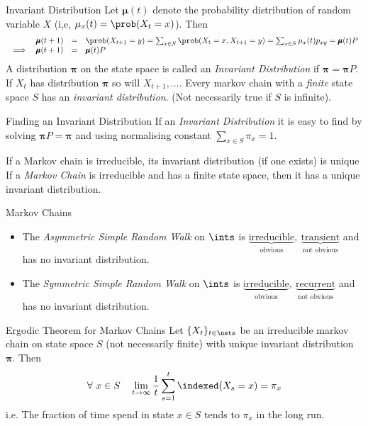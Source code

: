 \documentclass[11pt,a4paper]{article}
\begin{document}
\begin{definition}{Invariant Distribution}
  Let $\pmb\mu(t)$ denote the probability distribution of random variable $X$ (i,e, $\mu_x(t)=\prob(X_t=x)$). Then
  \[\begin{array}{rrcl}
    &\pmb\mu(t+1)&=&\prob(X_{t+1}=y)=\sum_{x\in S}\prob(X_t=x,X_{t+1}=y)=\sum_{x\in S}\mu_x(t)p_{xy}=\pmb\mu(t)P\\
    \implies&\pmb\mu(t+1)&=&\pmb\mu(t)P
  \end{array}\]
  A distribution $\pmb\pi$ on the state space is called an \textit{Invariant Distribution} if $\pmb\pi=\pmb\pi P$. If $X_t$ has distribution $\pmb\pi$ so will $X_{t+1},\dots$. Every markov chain with a \textit{finite} state space $S$ has an \textit{invariant distribution}. (Not necessarily true if $S$ is infinite).
\end{definition}

\begin{proposition}{Finding an Invariant Distribution}
  If an \textit{Invariant Distribution} it is easy to find by solving $\pmb\pi P=\pmb\pi$ and using normalising constant $\sum_{x\in S}\pi_x=1$.
\end{proposition}

\begin{remark}{If a Markov chain is irreducible, its invariant distribution (if one exists) is unique}
  If a \textit{Markov Chain} is irreducible and has a finite state space, then it has a unique invariant distribution.
\end{remark}

\begin{example}{Markov Chains}
  \begin{itemize}
    \item The \textit{Asymmetric Simple Random Walk} on $\ints$ is $\underbrace{\text{irreducible}}_\text{obvious},\ \underbrace{\text{transient}}_\text{not obvious}$ and has no invariant distribution.
    \item The \textit{Symmetric Simple Random Walk} on $\ints$ is $\underbrace{\text{irreducible}}_\text{obvious},\ \underbrace{\text{recurrent}}_\text{not obvious}$ and has no invariant distribution.
  \end{itemize}
\end{example}

\begin{theorem}{Ergodic Theorem for Markov Chains}
  Let $\{X_t\}_{t\in\nats}$ be an irreducible markov chain on state space $S$ (not necessarily finite) with unique invariant distribution $\pmb\pi$. Then
  \[ \forall\ x\in S\quad\lim_{t\to\infty}\frac1t\sum_{s=1}^t \indexed(X_s=x)=\pi_x\]
  i.e. The fraction of time spend in state $x\in S$ tends to $\pi_x$ in the long run.
\end{theorem}
\end{document}
